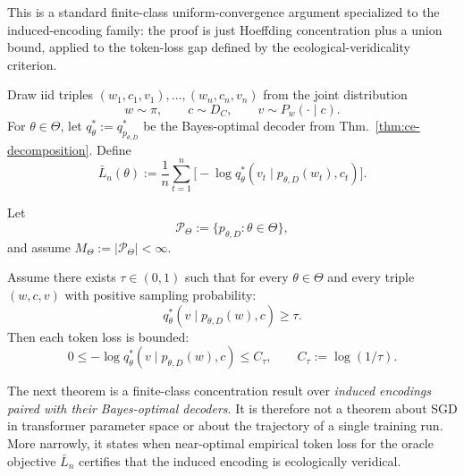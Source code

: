 \documentclass[twoside,11pt]{article}
\newcommand{\thmref}[1]{Thm.~\ref{#1}}
\begin{document}
This is a standard finite-class uniform-convergence argument specialized to the induced-encoding family: the proof is just Hoeffding concentration plus a union bound, applied to the token-loss gap defined by the ecological-veridicality criterion.

\begin{definition}\label{def:emp-risk}
Draw iid triples $(w_1,c_1,v_1),\ldots,(w_n,c_n,v_n)$ from the joint distribution
\[
w \sim \pi,
\qquad
c \sim D_C,
\qquad
v \sim P_w(\cdot \mid c).
\]
For $\theta \in \Theta$, let $q_{\theta}^* := q_{p_{\theta,D}}^*$ be the Bayes-optimal decoder from \thmref{thm:ce-decomposition}. Define
\[
\bar L_n(\theta)
:= \frac{1}{n}\sum_{t=1}^n
   \bigl[-\log q_{\theta}^*(v_t \mid p_{\theta,D}(w_t),c_t)\bigr].
\]
\end{definition}

\begin{definition}\label{ass:finite-class}
Let
\[
\mathcal{P}_\Theta := \{p_{\theta,D} : \theta \in \Theta\},
\]
and assume $M_\Theta := |\mathcal{P}_\Theta| < \infty$.
\end{definition}

\begin{definition}\label{ass:bounded-risk}
Assume there exists $\tau \in (0,1)$ such that for every $\theta \in \Theta$ and every triple $(w,c,v)$ with positive sampling probability:
\[
q_{\theta}^*(v \mid p_{\theta,D}(w),c) \ge \tau.
\]
Then each token loss is bounded:
\[
0 \le -\log q_{\theta}^*(v \mid p_{\theta,D}(w),c) \le C_\tau,
\qquad
C_\tau := \log(1/\tau).
\]
\end{definition}

The next theorem is a finite-class concentration result over \emph{induced encodings paired with their Bayes-optimal decoders}. It is therefore not a theorem about SGD in transformer parameter space or about the trajectory of a single training run. More narrowly, it states when near-optimal empirical token loss for the oracle objective $\bar L_n$ certifies that the induced encoding is ecologically veridical.
\end{document}
